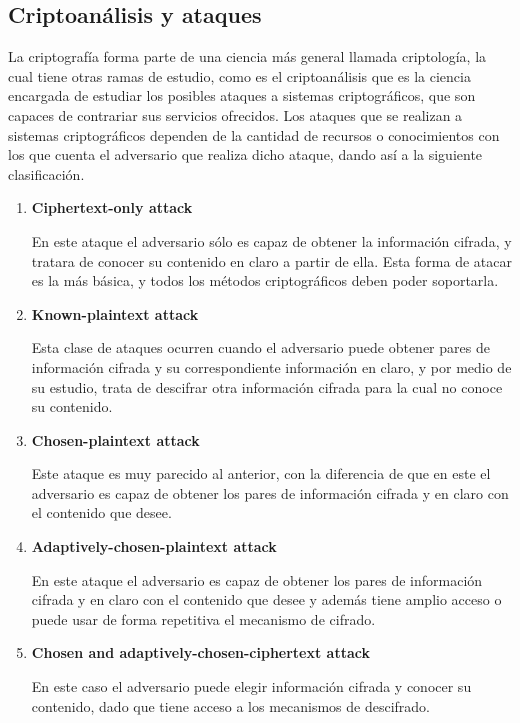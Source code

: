 
\subsection{Criptoanálisis y ataques}

  La criptografía forma parte de una ciencia más general llamada
  criptología, la cual tiene otras ramas de estudio, como es el
  criptoanálisis que es la ciencia encargada de estudiar los posibles
  ataques a sistemas criptográficos, que son capaces de contrariar sus
  servicios ofrecidos.
  Los ataques que se realizan a sistemas criptográficos dependen de la 
  cantidad de recursos o conocimientos con los que cuenta el adversario 
  que realiza dicho ataque, dando así a la siguiente clasificación.

  \begin{enumerate}

    \item \textbf{Ciphertext-only attack}

      En este ataque el adversario sólo es capaz de obtener la información
      cifrada, y tratara de conocer su contenido en claro a partir de ella.
      Esta forma de atacar es la más básica, y todos los métodos
      criptográficos deben poder soportarla.

    \item \textbf{Known-plaintext attack}

      Esta clase de ataques ocurren cuando el adversario puede obtener pares
      de información cifrada y su correspondiente información en claro, y
      por medio de su estudio, trata de descifrar otra información cifrada
      para la cual no conoce su contenido.

    \item \textbf{Chosen-plaintext attack}

      Este ataque es muy parecido al anterior, con la diferencia de que en
      este el adversario es capaz de obtener los pares de información
      cifrada y en claro con el contenido que desee.

    \item \textbf{Adaptively-chosen-plaintext attack}

      En este ataque el adversario es capaz de obtener los pares de
      información cifrada y en claro con el contenido que desee y además 
      tiene amplio acceso o puede usar de forma repetitiva el mecanismo de
      cifrado.

    \item \textbf{Chosen and adaptively-chosen-ciphertext attack}

      En este caso el adversario puede elegir información cifrada y conocer
      su contenido, dado que tiene acceso a los mecanismos de descifrado.

  \end{enumerate}
